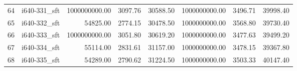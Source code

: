 \begin{tabular}{llrrrrrr}
64 &  i640-331\_sft &         1000000000.00 &                   3097.76 &            30588.50 &      1000000000.00 &                3496.71 &         39998.40 \\
65 &  i640-332\_sft &              54825.00 &                   2774.15 &            30478.50 &      1000000000.00 &                3568.80 &         39730.40 \\
66 &  i640-333\_sft &         1000000000.00 &                   3051.80 &            30619.20 &      1000000000.00 &                3477.63 &         39499.20 \\
67 &  i640-334\_sft &              55114.00 &                   2831.61 &            31157.00 &      1000000000.00 &                3478.15 &         39367.80 \\
68 &  i640-335\_sft &              54289.00 &                   2790.62 &            31224.50 &      1000000000.00 &                3503.33 &         40147.40 \\
\bottomrule
\end{tabular}
